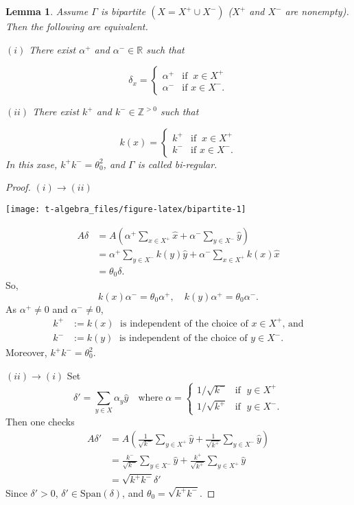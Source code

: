 \documentclass[
]{book}
\newtheorem{lemma}{Lemma}[chapter]
\theoremstyle{definition}
\theoremstyle{definition}
\theoremstyle{definition}
\theoremstyle{definition}
\theoremstyle{remark}
\begin{document}
\begin{lemma}
\protect\hypertarget{lem:baiparite-principal}{}\label{lem:baiparite-principal}Assume \(\Gamma\) is bipartite \((X = X^+ \cup X^-)\) (\(X^+\) and \(X^-\) are nonempty). Then the following are equivalent.

\((i)\) There exist \(\alpha^+\) and \(\alpha^-\in \mathbb{R}\) such that

\[\delta_x = \begin{cases} \alpha^+ & \text{if }\: x\in X^+\\
\alpha^- & \text{if } x\in X^-.
\end{cases}\]

\((ii)\) There exist \(k^+\) and \(k^-\in \mathbb{Z}^{>0}\) such that

\[k(x) = \begin{cases} k^+ & \text{if }\: x\in X^+\\
k^- & \text{if } x\in X^-.
\end{cases}\]
In this xase, \(k^+k^- = \theta_0^2\), and \(\Gamma\) is called bi-regular.
\end{lemma}

\begin{proof}
\((i)\to(ii)\)

\begin{center}\texttt{[image: t-algebra\_files/figure-latex/bipartite-1]} \end{center}

\begin{align}
A\delta & = A\left(\alpha^+\sum_{x\in X^+}\hat{x} + \alpha^-\sum_{y\in X^-}\hat{y}\right)\\
& = \alpha^+\sum_{y\in X^-}k(y)\hat{y} + \alpha^-\sum_{x\in X^+}k(x)\hat{x}\\
& = \theta_0\delta.
\end{align}
So,
\[k(x)\alpha^- = \theta_0\alpha^+, \quad k(y)\alpha^+ = \theta_0\alpha^-.\]
As \(\alpha^+\neq 0\) and \(\alpha^- \neq 0\),
\begin{align}
k^+ & := k(x) \; \text{ is independent of the choice of $x\in X^+$, and}\\
k^- & := k(y) \; \text{ is independent of the choice of $y\in X^-$.}
\end{align}
Moreover, \(k^+k^- = \theta_0^2\).

\((ii)\to(i)\)
Set
\[\delta' = \sum_{y\in X}\alpha_y\hat{y} \quad \text{where}\; \alpha = \begin{cases} 1/\sqrt{k^-} & \text{if }\; y\in X^+\\ 1/\sqrt{k^+} & \text{if }\; y\in X^-.\end{cases}\]
Then one checks
\begin{align}
A\delta' & = A\left(\frac{1}{\sqrt{k^-}}\sum_{y\in X^+}\hat{y} + \frac{1}{\sqrt{k^+}}\sum_{y\in X^-}\hat{y}\right)\\
& =  \frac{k^-}{\sqrt{k^-}}\sum_{y\in X^-}\hat{y} + \frac{k^+}{\sqrt{k^+}}\sum_{y\in X^+}\hat{y}\\
& = \sqrt{k^+k^-}\delta'
\end{align}
Since \(\delta' >0\), \(\delta'\in \mathrm{Span}(\delta)\), and \(\theta_0 = \sqrt{k^+k^-}\).
\end{proof}
\end{document}
